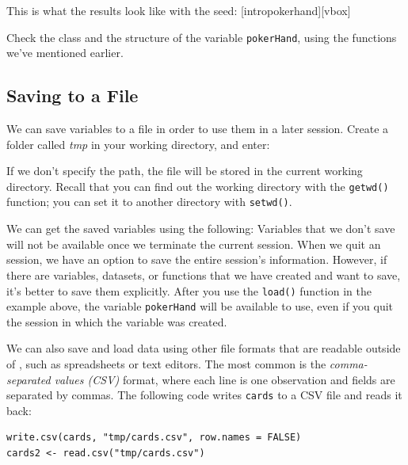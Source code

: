 This is what the results look like with the seed:
[intropokerhand][vbox]


Check the class and the structure of the variable \lstinline{pokerHand}, using the
functions we've mentioned earlier.

\subsection{Saving to a File}
We can save variables to a file in order to use them in a later session. Create a
folder called \emph{tmp} in your working directory, and enter:


If we don't specify the path, the file will be stored in the current working directory.
Recall that you can find out the working directory with the \lstinline{getwd()} function;
you can set it to another directory with \lstinline{setwd()}.


We can get the saved variables using the following:
Variables that we don't save will not be available once we terminate the current
\R session. When we quit an \R session, we have an option to save the entire session's
information. However, if there are variables, datasets, or functions that we have created
and want to save, it's better to save them explicitly. After you use the \lstinline{load()}
function in the example above, the variable \lstinline{pokerHand} will be available
to use, even if you quit the \R session in which the variable was created.


We can also save and load data using other file formats that are readable
outside of \R, such as spreadsheets or text editors. The most common is the
\emph{comma-separated values (CSV)} format,
where each line is one observation and fields are separated by commas.
The following code writes \lstinline{cards} to a CSV file and reads it back:
\begin{lstlisting}
write.csv(cards, "tmp/cards.csv", row.names = FALSE)
cards2 <- read.csv("tmp/cards.csv")
\end{lstlisting}


